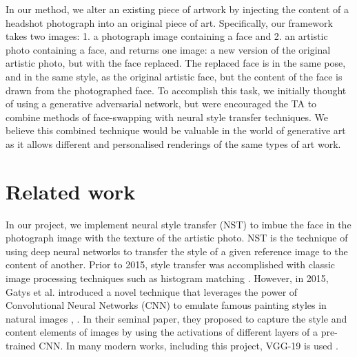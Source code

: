 \documentclass{article}
\begin{document}
In our method, we alter an existing piece of artwork by injecting the content of a headshot photograph into an original piece of art. Specifically, our framework takes two images: 1. a photograph image containing a face and 2. an artistic photo containing a face, and returns one image: a new version of the original artistic photo, but with the face replaced. The replaced face is in the same pose, and in the same style, as the original artistic face, but the content of the face is drawn from the photographed face. To accomplish this task, we initially thought of using a generative adversarial network, but were encouraged the TA to combine methods of face-swapping with neural style transfer techniques. We believe this combined technique would be valuable in the world of generative art as it allows different and personalised renderings of the same types of art work. 

\section{Related work}

In our project, we implement neural style transfer (NST) to imbue the face in the photograph image with the texture of the artistic photo. NST is the technique of using deep neural networks to transfer the style of a given reference image to the content of another. Prior to 2015, style transfer was accomplished with classic image processing techniques such as histogram matching \cite{neumann2005color}. However, in 2015, Gatys et al. introduced a novel technique that leverages the power of Convolutional Neural Networks (CNN) to emulate famous painting styles in natural images \cite{gatys2015neural}, \cite{gatys2016}. In their seminal paper, they proposed to capture the style and content elements of images by using the activations of different layers of a pre-trained CNN. In many modern works, including this project, VGG-19 is used \cite{Simonyan14c}. 
\end{document}
